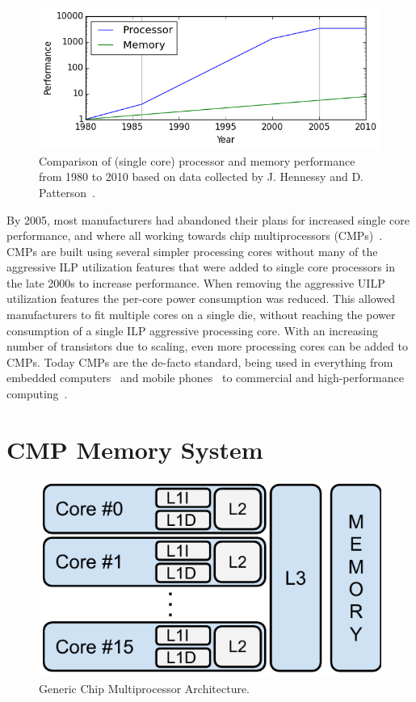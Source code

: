 \begin{figure}[ht]
\centering
\includegraphics[width=.8\textwidth]{figures/introduction/memory-gap}
\caption{Comparison of (single core) processor and memory performance from 1980 to 2010 based on data collected by J. Hennessy and D. Patterson~\cite{hennessy2012}.}
\label{fig:introduction:memgap}
\end{figure}

By 2005, most manufacturers had abandoned their plans for increased single core performance, and where all working towards chip multiprocessors (CMPs)~\cite{Sutter2005}.
CMPs are built using several simpler processing cores without many of the aggressive ILP utilization features that were added to single core processors in the late 2000s to increase performance.
When removing the aggressive UILP utilization features the per-core power consumption was reduced.
This allowed manufacturers to fit multiple cores on a single die, without reaching the power consumption of a single ILP aggressive processing core.
With an increasing number of transistors due to scaling, even more processing cores can be added to CMPs.
Today CMPs are the de-facto standard, being used in everything from embedded computers~\cite{ARM2010} and mobile phones~\cite{Ho2014} to commercial and high-performance computing~\cite{Thomadakis2011, Jain2013}.


\section{CMP Memory System}

\begin{figure}[ht]
\centering
\includegraphics[scale=.65]{figures/processor_model/processor_model}
\caption{Generic Chip Multiprocessor Architecture.}
\label{fig:cmp_model}
\end{figure}


